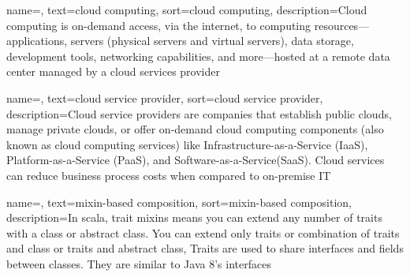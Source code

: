 
\renewcommand{\acronymname}{Acronyms and abbreviations}




%

{
    name=,
    text=cloud computing,
    sort=cloud computing,
    description={Cloud computing is on-demand access, via the internet, to computing resources—applications, servers (physical servers and virtual servers), data storage, development tools, networking capabilities, and more—hosted at a remote data center managed by a cloud services provider}
}

{
    name=,
    text=cloud service provider,
    sort=cloud service provider,
    description={Cloud service providers are companies that establish public clouds, manage private clouds, or offer on-demand cloud computing components (also known as cloud computing services) like Infrastructure-as-a-Service (IaaS), Platform-as-a-Service (PaaS), and Software-as-a-Service(SaaS). Cloud services can reduce business process costs when compared to on-premise IT}
}

{
    name=,
    text=mixin-based composition,
    sort=mixin-based composition,
    description={In scala, trait mixins means you can extend any number of traits with a class or abstract class. You can extend only traits or combination of traits and class or traits and abstract class,
    Traits are used to share interfaces and fields between classes. They are similar to Java 8’s interfaces }
}

